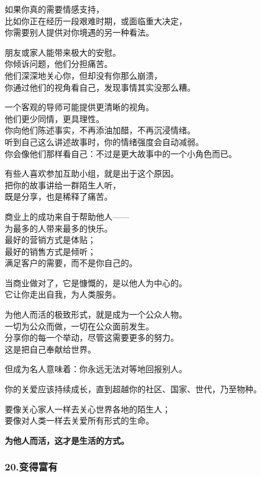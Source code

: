 \documentclass[
]{article}
\begin{document}
如果你真的需要情感支持，\\
比如你正在经历一段艰难时期，或面临重大决定，\\
你需要别人提供对你境遇的另一种看法。

朋友或家人能带来极大的安慰。\\
你倾诉问题，他们分担痛苦。\\
他们深深地关心你，但却没有你那么崩溃，\\
你通过他们的视角看自己，发现事情其实没那么糟。

一个客观的导师可能提供更清晰的视角。\\
他们更少同情，更具理性。\\
你向他们陈述事实，不再添油加醋，不再沉浸情绪。\\
听到自己这么讲述故事时，你的情绪强度会自动减弱。\\
你会像他们那样看自己：不过是更大故事中的一个小角色而已。

有些人喜欢参加互助小组，就是出于这个原因。\\
把你的故事讲给一群陌生人听，\\
既是分享，也是稀释了痛苦。

商业上的成功来自于帮助他人------\\
为最多的人带来最多的快乐。\\
最好的营销方式是体贴；\\
最好的销售方式是倾听；\\
满足客户的需要，而不是你自己的。

当商业做对了，它是慷慨的，是以他人为中心的。\\
它让你走出自我，为人类服务。

为他人而活的极致形式，就是成为一个公众人物。\\
一切为公众而做，一切在公众面前发生。\\
分享你的每一个举动，尽管这需要更多的努力。\\
这是把自己奉献给世界。

但成为名人意味着：你永远无法对等地回报别人。

你的关爱应该持续成长，直到超越你的社区、国家、世代，乃至物种。

要像关心家人一样去关心世界各地的陌生人；\\
要像对人类一样去关爱所有形式的生命。

\textbf{为他人而活，这才是生活的方式。}

\subsubsection{20.变得富有}\label{20ux53d8ux5f97ux5bccux6709}
\end{document}
